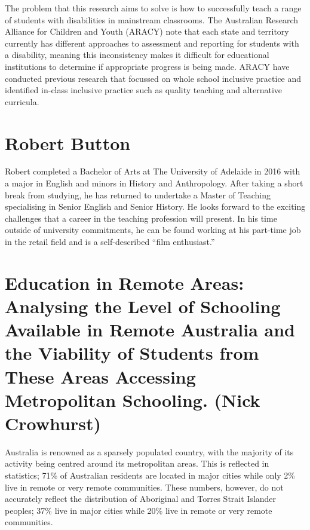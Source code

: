 \documentclass[twoside,12pt,a4paper,notitlepage]{memoir}
\begin{document}
The problem that this research aims to solve is how to successfully teach a range of students with disabilities in mainstream classrooms. The Australian Research Alliance for Children and Youth (ARACY) note that each state and territory currently has different approaches to assessment and reporting for students with a disability, meaning this inconsistency makes it difficult for educational institutions to determine if appropriate progress is being made. ARACY have conducted previous research that focussed on whole school inclusive practice and identified in-class inclusive practice such as quality teaching and alternative curricula.

\section*{Robert Button}

Robert completed a Bachelor of Arts at The University of Adelaide in 2016 with a major in English and minors in History and Anthropology. After taking a short break from studying, he has returned to undertake a Master of Teaching specialising in Senior English and Senior History. He looks forward to the exciting challenges that a career in the teaching profession will present. In his time outside of university commitments, he can be found working at his part-time job in the retail field and is a self-described “film enthusiast.”



\pagebreak
\section*{Education in Remote Areas: Analysing the Level of Schooling Available in Remote Australia and the Viability of Students from These Areas Accessing Metropolitan Schooling. (Nick Crowhurst)}
\label{aut:crowhurst}

Australia is renowned as a sparsely populated country, with the majority of its activity being centred around its metropolitan areas. This is reflected in statistics; 71\% of Australian residents are located in major cities while only 2\% live in remote or very remote communities. These numbers, however, do not accurately reflect the distribution of Aboriginal and Torres Strait Islander peoples; 37\% live in major cities while 20\% live in remote or very remote communities.
 
\end{document}
